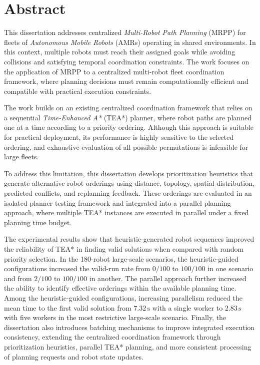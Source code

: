 %
\chapter*{Abstract}
\hspace{\parindent}
This dissertation addresses centralized \emph{Multi-Robot Path Planning} (MRPP) for fleets of \emph{Autonomous Mobile Robots} (AMRs) operating in shared environments. In this context, multiple robots must reach their assigned goals while avoiding collisions and satisfying temporal coordination constraints. The work focuses on the application of MRPP to a centralized multi-robot fleet coordination framework, where planning decisions must remain computationally efficient and compatible with practical execution constraints.

The work builds on an existing centralized coordination framework that relies on a sequential \emph{Time-Enhanced A*} (TEA*) planner, where robot paths are planned one at a time according to a priority ordering. Although this approach is suitable for practical deployment, its performance is highly sensitive to the selected ordering, and exhaustive evaluation of all possible permutations is infeasible for large fleets.

To address this limitation, this dissertation develops prioritization heuristics that generate alternative robot orderings using distance, topology, spatial distribution, predicted conflicts, and replanning feedback. These orderings are evaluated in an isolated planner testing framework and integrated into a parallel planning approach, where multiple TEA* instances are executed in parallel under a fixed planning time budget.

The experimental results show that heuristic-generated robot sequences improved the reliability
of TEA* in finding valid solutions when compared with random priority selection. In the 180-robot
large-scale scenarios, the heuristic-guided configurations increased the valid-run rate from
\(0/100\) to \(100/100\) in one scenario and from \(2/100\) to \(100/100\) in another. The parallel approach further increased the ability to identify effective orderings within the available planning
time. Among the heuristic-guided configurations, increasing parallelism reduced the mean time to the
first valid solution from \(7.32\,\mathrm{s}\) with a single worker to \(2.83\,\mathrm{s}\) with five
workers in the most restrictive large-scale scenario. Finally, the dissertation also
introduces batching mechanisms to improve integrated execution consistency, extending the
centralized coordination framework through prioritization heuristics, parallel TEA* planning, and
more consistent processing of planning requests and robot state updates.


